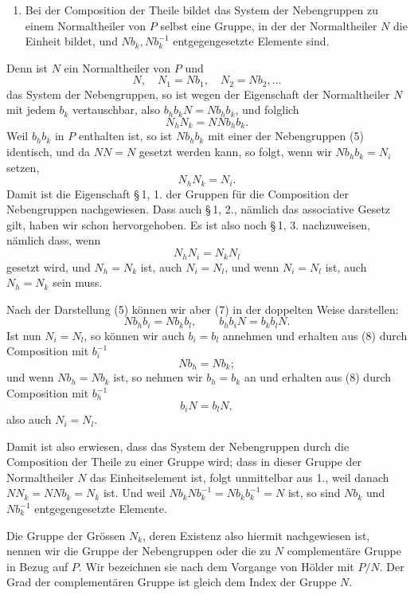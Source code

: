 \documentclass[11pt]{article}
\begin{document}
\begin{enumerate}[resume,label=\arabic*.]
\item Bei der Composition der Theile bildet das System der Nebengruppen zu einem Normaltheiler von $P$ selbst eine Gruppe, in der der Normaltheiler $N$ die Einheit bildet, und $Nb_k,Nb_k^{-1}$ entgegengesetzte Elemente sind.
\end{enumerate}
Denn ist $N$ ein Normaltheiler von $P$ und
\begin{equation}
N,\quad N_1=Nb_1,\quad N_2=Nb_2,\ldots
\tag{5}
\end{equation}
das System der Nebengruppen, so ist wegen der Eigenschaft der Normaltheiler $N$ mit jedem $b_k$ vertauschbar, also $b_hb_kN=Nb_hb_k$, und folglich
\[
N_hN_k=NNb_hb_k.
\]
Weil $b_hb_k$ in $P$ enthalten ist, so ist $Nb_hb_k$ mit einer der Nebengruppen (5) identisch, und da $NN=N$ gesetzt werden kann, so folgt, wenn wir $Nb_hb_k=N_i$ setzen,
\begin{equation}
N_hN_k=N_i.
\tag{6}
\end{equation}
Damit ist die Eigenschaft \S\,1, 1. der Gruppen für die Composition der Nebengruppen nachgewiesen. Dass auch \S\,1, 2., nämlich das associative Gesetz gilt, haben wir schon hervorgehoben. Es ist also noch \S\,1, 3. nachzuweisen, nämlich dass, wenn
\begin{equation}
N_hN_i=N_kN_l
\tag{7}
\end{equation}
gesetzt wird, und $N_h=N_k$ ist, auch $N_i=N_l$, und wenn $N_i=N_l$ ist, auch $N_h=N_k$ sein muss.

Nach der Darstellung (5) können wir aber (7) in der doppelten Weise darstellen:
\begin{equation}
Nb_hb_i=Nb_kb_l,
\qquad b_hb_iN=b_kb_lN.
\tag{8}
\end{equation}
Ist nun $N_i=N_l$, so können wir auch $b_i=b_l$ annehmen und erhalten aus (8) durch Composition mit $b_i^{-1}$
\[
Nb_h=Nb_k;
\]
und wenn $Nb_h=Nb_k$ ist, so nehmen wir $b_h=b_k$ an und erhalten aus (8) durch Composition mit $b_h^{-1}$
\[
b_iN=b_lN,
\]
also auch $N_i=N_l$.

Damit ist also erwiesen, dass das System der Nebengruppen durch die Composition der Theile zu einer Gruppe wird; dass in dieser Gruppe der Normaltheiler $N$ das Einheitselement ist, folgt unmittelbar aus 1., weil danach $NN_k=NNb_k=N_k$ ist. Und weil $Nb_kNb_k^{-1}=Nb_kb_k^{-1}=N$ ist, so sind $Nb_k$ und $Nb_k^{-1}$ entgegengesetzte Elemente.

Die Gruppe der Grössen $N_k$, deren Existenz also hiermit nachgewiesen ist, nennen wir die Gruppe der Nebengruppen oder die zu $N$ complementäre Gruppe in Bezug auf $P$. Wir bezeichnen sie nach dem Vorgange von Hölder mit $P/N$. Der Grad der complementären Gruppe ist gleich dem Index der Gruppe $N$.
\end{document}
